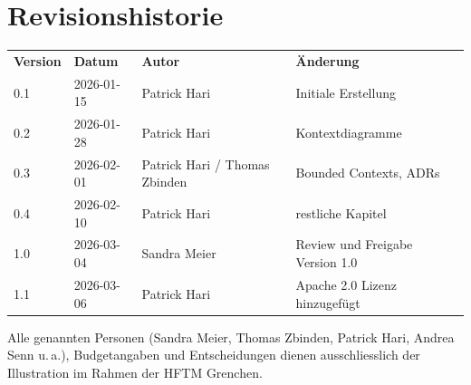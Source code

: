 \documentclass[a4paper,11pt]{article}
\begin{document}
\newpage

\section*{Revisionshistorie}
\begin{tabularx}{\textwidth}{C{1.5cm} C{2.2cm} L{3.5cm} X}
  \color{white}\textbf{Version} & \color{white}\textbf{Datum} & \color{white}\textbf{Autor} & \color{white}\textbf{Änderung} \\
  0.1  & 2026-01-15 & Patrick Hari & Initiale Erstellung \\
  0.2  & 2026-01-28 & Patrick Hari & Kontextdiagramme \\
  0.3  & 2026-02-01 & Patrick Hari / Thomas Zbinden & Bounded Contexts, ADRs \\
  0.4  & 2026-02-10 & Patrick Hari & restliche Kapitel \\
  1.0  & 2026-03-04 & Sandra Meier  & Review und Freigabe Version 1.0 \\
  1.1  & 2026-03-06 & Patrick Hari & Apache 2.0 Lizenz hinzugefügt \\
\end{tabularx}

\vspace{0.5cm}
\begin{hinweis}
Alle genannten Personen (Sandra Meier, Thomas Zbinden, Patrick Hari, Andrea Senn u.\,a.),
Budgetangaben und Entscheidungen dienen ausschliesslich der Illustration im Rahmen der HFTM Grenchen.
\end{hinweis}

\newpage
\tableofcontents
\newpage


\newpage

\newpage

\newpage

\newpage

\newpage

\newpage

\newpage

\newpage

\newpage

\newpage

\newpage

\newpage

\newpage

\newpage

\appendix

\newpage

\newpage

\newpage
\printbibliography[title={Literaturverzeichnis}, heading=bibintoc]
\end{document}
